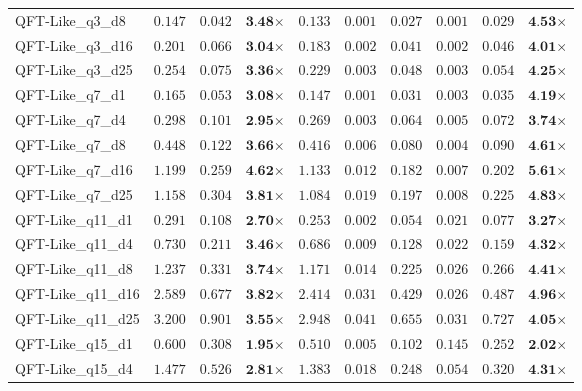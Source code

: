 \begin{table*}[t]
{\begin{tabular}{| l || r r c || r r r r r c |}
QFT-Like\_q3\_d8 & $0.147$ & $0.042$ & $\textbf{3.48}$$\times$ & $0.133$ & $0.001$ & $0.027$ & $0.001$ & $0.029$ & $\textbf{4.53}$$\times$ \\
QFT-Like\_q3\_d16 & $0.201$ & $0.066$ & $\textbf{3.04}$$\times$ & $0.183$ & $0.002$ & $0.041$ & $0.002$ & $0.046$ & $\textbf{4.01}$$\times$ \\
QFT-Like\_q3\_d25 & $0.254$ & $0.075$ & $\textbf{3.36}$$\times$ & $0.229$ & $0.003$ & $0.048$ & $0.003$ & $0.054$ & $\textbf{4.25}$$\times$ \\
QFT-Like\_q7\_d1 & $0.165$ & $0.053$ & $\textbf{3.08}$$\times$ & $0.147$ & $0.001$ & $0.031$ & $0.003$ & $0.035$ & $\textbf{4.19}$$\times$ \\
QFT-Like\_q7\_d4 & $0.298$ & $0.101$ & $\textbf{2.95}$$\times$ & $0.269$ & $0.003$ & $0.064$ & $0.005$ & $0.072$ & $\textbf{3.74}$$\times$ \\
QFT-Like\_q7\_d8 & $0.448$ & $0.122$ & $\textbf{3.66}$$\times$ & $0.416$ & $0.006$ & $0.080$ & $0.004$ & $0.090$ & $\textbf{4.61}$$\times$ \\
QFT-Like\_q7\_d16 & $1.199$ & $0.259$ & $\textbf{4.62}$$\times$ & $1.133$ & $0.012$ & $0.182$ & $0.007$ & $0.202$ & $\textbf{5.61}$$\times$ \\
QFT-Like\_q7\_d25 & $1.158$ & $0.304$ & $\textbf{3.81}$$\times$ & $1.084$ & $0.019$ & $0.197$ & $0.008$ & $0.225$ & $\textbf{4.83}$$\times$ \\
QFT-Like\_q11\_d1 & $0.291$ & $0.108$ & $\textbf{2.70}$$\times$ & $0.253$ & $0.002$ & $0.054$ & $0.021$ & $0.077$ & $\textbf{3.27}$$\times$ \\
QFT-Like\_q11\_d4 & $0.730$ & $0.211$ & $\textbf{3.46}$$\times$ & $0.686$ & $0.009$ & $0.128$ & $0.022$ & $0.159$ & $\textbf{4.32}$$\times$ \\
QFT-Like\_q11\_d8 & $1.237$ & $0.331$ & $\textbf{3.74}$$\times$ & $1.171$ & $0.014$ & $0.225$ & $0.026$ & $0.266$ & $\textbf{4.41}$$\times$ \\
QFT-Like\_q11\_d16 & $2.589$ & $0.677$ & $\textbf{3.82}$$\times$ & $2.414$ & $0.031$ & $0.429$ & $0.026$ & $0.487$ & $\textbf{4.96}$$\times$ \\
QFT-Like\_q11\_d25 & $3.200$ & $0.901$ & $\textbf{3.55}$$\times$ & $2.948$ & $0.041$ & $0.655$ & $0.031$ & $0.727$ & $\textbf{4.05}$$\times$ \\
QFT-Like\_q15\_d1 & $0.600$ & $0.308$ & $\textbf{1.95}$$\times$ & $0.510$ & $0.005$ & $0.102$ & $0.145$ & $0.252$ & $\textbf{2.02}$$\times$ \\
QFT-Like\_q15\_d4 & $1.477$ & $0.526$ & $\textbf{2.81}$$\times$ & $1.383$ & $0.018$ & $0.248$ & $0.054$ & $0.320$ & $\textbf{4.31}$$\times$ \\

\end{tabular}}
\end{table*}

